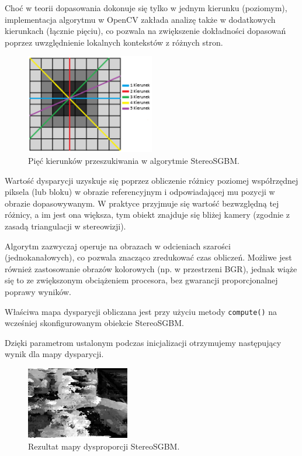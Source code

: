 \documentclass[magisterska]{pracadypl}
\begin{document}
Choć w teorii dopasowania dokonuje się tylko w jednym kierunku (poziomym), implementacja algorytmu w OpenCV zakłada analizę także w dodatkowych kierunkach (łącznie pięciu), co pozwala na zwiększenie dokładności dopasowań poprzez uwzględnienie lokalnych kontekstów z różnych stron.

\begin{figure}[H]
\centering
\includegraphics[width=0.5\textwidth]{images/dopracy2.png}
\captionsetup{font=footnotesize}
\caption[Pięć kierunków przeszukiwania w algorytmie StereoSGBM. Opracowanie własne.]{Pięć kierunków przeszukiwania w algorytmie StereoSGBM.}
\end{figure}

Wartość dysparycji uzyskuje się poprzez obliczenie różnicy poziomej współrzędnej piksela (lub bloku) w obrazie referencyjnym i odpowiadającej mu pozycji w obrazie dopasowywanym. W praktyce przyjmuje się wartość bezwzględną tej różnicy, a im jest ona większa, tym obiekt znajduje się bliżej kamery (zgodnie z zasadą triangulacji w stereowizji).

Algorytm zazwyczaj operuje na obrazach w odcieniach szarości (jednokanałowych), co pozwala znacząco zredukować czas obliczeń. Możliwe jest również zastosowanie obrazów kolorowych (np. w przestrzeni BGR), jednak wiąże się to ze zwiększonym obciążeniem procesora, bez gwarancji proporcjonalnej poprawy wyników.

Właściwa mapa dysparycji obliczana jest przy użyciu metody \texttt{compute()} na wcześniej skonfigurowanym obiekcie StereoSGBM.

Dzięki parametrom ustalonym podczas inicjalizacji otrzymujemy następujący wynik dla mapy dysparycji.

\begin{figure}[H]  %
    \centering  %
    \includegraphics[width=0.4\textwidth]{images/disparity.png}  %
    \captionsetup{font=footnotesize}
    \caption[Rezultat mapy dysproporcji StereoSGBM. Opracowanie własne.]{Rezultat mapy dysproporcji StereoSGBM.}
\end{figure}
\end{document}
